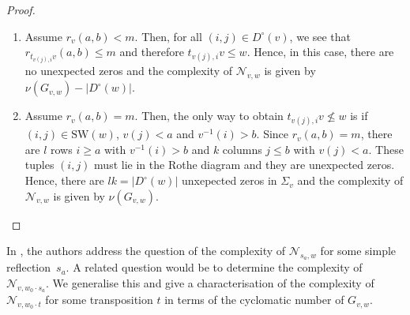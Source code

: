 \documentclass[11pt]{amsart}
\theoremstyle{definition}
\theoremstyle{definition}
\theoremstyle{definition}
\theoremstyle{definition}
\newcommand{\SW}{\mathrm{SW}}
\newcommand{\Gvwt}{G_{v,w}}
\newcommand{\Nvw}{\mathcal{N}_{v,w}}
\newcommand{\Dc}{D^{\circ}}
\newcommand{\cn}{\nu}
\newcommand{\rk}{r}
\begin{document}
\begin{proof}
    \begin{enumerate}
        \item Assume $\rk_v(a,b) <m$. Then, for all $(i,j) \in \Dc(v)$, we see that $\rk_{t_{v(j),i}v}(a,b) \leq m$ and therefore $t_{v(j),i}v \leq w$. Hence, in this case, there are no unexpected zeros and the complexity of $\Nvw$ is given by $\cn(\Gvwt) - |\Dc(w)|$.
    \item Assume $\rk_v(a,b) =m$. Then, the only way to obtain $t_{v(j),i}v \not\leq w$ is if $(i,j) \in \SW(w)$, $v(j) <a$ and $v^{-1}(i) >b$. Since $\rk_v(a,b)= m$, there are $l$ rows $i \geq a$ with $v^{-1}(i) >b$ and $k$ columns $j \leq b$ with $v(j) <a$. These tuples $(i,j)$ must lie in the Rothe diagram and they are unexpected zeros. Hence, there are $lk = |\Dc(w)|$ unxepected zeros in $\Sigma_v$ and the complexity of $\Nvw$ is given by $\cn(\Gvwt)$.\qedhere
    \end{enumerate}\end{proof}
\noindent In \cite[Thm 5.14]{donten2021complexity}, the authors address the question of the complexity of $\mathcal N_{s_a,w}$ for some simple reflection~$s_a$. A related question would be to determine the complexity of $\mathcal N_{v,w_0\cdot s_a}$. We generalise this and give a characterisation of the complexity of $\mathcal N_{v,w_0\cdot t}$ for some transposition $t$ in terms of the cyclomatic number of $\Gvwt$.
\end{document}
